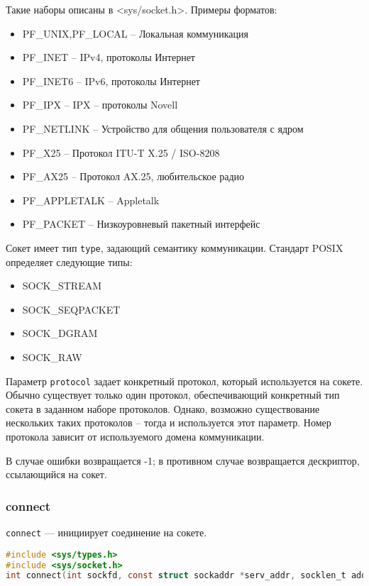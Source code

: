 Такие наборы описаны в <sys/socket.h>. Примеры форматов: 

\begin{itemize}
\item PF\_UNIX,PF\_LOCAL -- Локальная коммуникация
\item PF\_INET --	IPv4, протоколы Интернет
\item PF\_INET6 -- IPv6, протоколы Интернет
\item PF\_IPX -- IPX -- протоколы Novell
\item PF\_NETLINK -- Устройство для общения пользователя с ядром
\item PF\_X25 -- Протокол ITU-T X.25 / ISO-8208
\item PF\_AX25 -- Протокол AX.25, любительское радио 
\item PF\_APPLETALK -- Appletalk
\item PF\_PACKET -- Низкоуровневый пакетный интерфейс
\end{itemize}

Сокет имеет тип {\tt type}, задающий семантику коммуникации. Стандарт POSIX определяет следующие типы:

\begin{itemize}
	\item SOCK\_STREAM 
	\item SOCK\_SEQPACKET
	\item SOCK\_DGRAM
	\item SOCK\_RAW
\end{itemize}


Параметр {\tt protocol} задает конкретный протокол, который используется на сокете. 
Обычно существует только один протокол, обеспечивающий конкретный тип сокета в 
заданном наборе протоколов. Однако, возможно существование нескольких таких 
протоколов -- тогда и используется этот параметр. 
Номер протокола зависит от используемого домена коммуникации.

 В случае ошибки возвращается -1; в противном случае возвращается дескриптор, ссылающийся на сокет. 

\subsubsection{connect}
{\tt connect} --- инициирует соединение на сокете.

\begin{lstlisting}[language=C]
#include <sys/types.h> 
#include <sys/socket.h> 
int connect(int sockfd, const struct sockaddr *serv_addr, socklen_t addrlen); 
\end{lstlisting}

